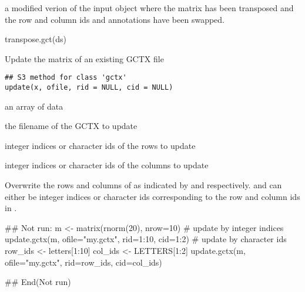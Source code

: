 \documentclass[letterpaper]{book}
\begin{document}
%
\begin{Value}
a modified verion of the input  object
where the matrix has been transposed and the row and column
ids and annotations have been swapped.
\end{Value}
%
\begin{Examples}
\begin{ExampleCode}
transpose.gct(ds)

\end{ExampleCode}
\end{Examples}
%
\begin{Description}\relax
Update the matrix of an existing GCTX file
\end{Description}
%
\begin{Usage}
\begin{verbatim}
## S3 method for class 'gctx'
update(x, ofile, rid = NULL, cid = NULL)
\end{verbatim}
\end{Usage}
%
\begin{Arguments}
\begin{ldescription}
\item[\code{x}] an array of data

\item[\code{ofile}] the filename of the GCTX to update

\item[\code{rid}] integer indices or character ids of the rows
to update

\item[\code{cid}] integer indices or character ids of the columns
to update
\end{ldescription}
\end{Arguments}
%
\begin{Details}\relax
Overwrite the rows and columns of  
as indicated by  and  respectively.
 and  can either be integer indices
or character ids corresponding to the row and column ids
in .
\end{Details}
%
\begin{Examples}
\begin{ExampleCode}
## Not run: 
m <- matrix(rnorm(20), nrow=10)
# update by integer indices
update.gctx(m, ofile="my.gctx", rid=1:10, cid=1:2)
# update by character ids
row_ids <- letters[1:10]
col_ids <- LETTERS[1:2]
update.gctx(m, ofile="my.gctx", rid=row_ids, cid=col_ids)

## End(Not run)
\end{ExampleCode}
\end{Examples}
\end{document}
